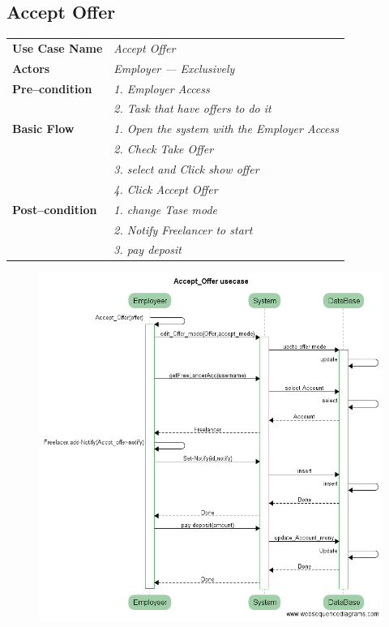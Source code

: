 \documentclass{article}
\begin{document}
\subsection{Accept Offer}
    \begin{tabular}{ l | l }
    \toprule
      \rowcolor{LightCyan}
      \textbf{Use Case Name}    & \textit{Accept Offer}\\
      \textbf{Actors}           & \textit{Employer --- Exclusively}\\
      \rowcolor{LightCyan}
      \textbf{Pre--condition}   & \textit{1. Employer Access}\\
                                & \textit{2. Task that have offers to do it}\\
      \textbf{Basic Flow}       & \textit{1. Open the system with the Employer Access}\\
                                & \textit{2. Check Take Offer}\\
                                & \textit{3. select and Click show offer}\\
				& \textit{4. Click Accept Offer}\\

      \rowcolor{LightCyan}
      \textbf{Post--condition}  & \textit{1. change Tase mode}\\
                                & \textit{2. Notify Freelancer to start}\\
                                & \textit{3. pay deposit}\\
    \toprule
    \end{tabular}

\begin{figure}[ht!]
\centering
\includegraphics[width=128mm]{Accept_Offer_usecase.png}
\end{figure}
\end{document}
